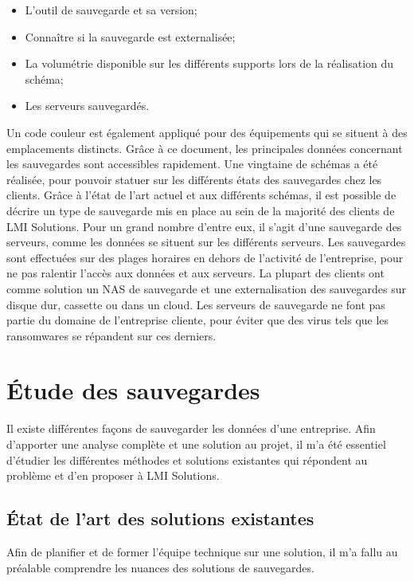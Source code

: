 \documentclass[pfe]{tnreport} %
\begin{document}
\begin{itemize}
 \item L'outil de sauvegarde et sa version;
 \item Connaître si la sauvegarde est externalisée;
 \item La volumétrie disponible sur les différents supports lors de la réalisation du schéma;
 \item Les serveurs sauvegardés.\newline
\end{itemize} 
Un code couleur est également appliqué pour des équipements qui se situent à des emplacements distincts.
Grâce à ce document, les principales données concernant les sauvegardes sont accessibles rapidement.
Une vingtaine de schémas a été réalisée, pour pouvoir statuer sur les différents états des sauvegardes chez les clients.
Grâce à l'état de l'art actuel et aux différents schémas, il est possible de décrire un type de sauvegarde mis en place au sein de la majorité des clients de LMI Solutions. \newline
Pour un grand nombre d'entre eux, il s'agit d'une sauvegarde des serveurs, comme les données se situent sur les différents serveurs. \newline
Les sauvegardes sont effectuées sur des plages horaires en dehors de l'activité de l'entreprise, pour ne pas ralentir l'accès aux données et aux serveurs. \newline
La plupart des clients ont comme solution un NAS de sauvegarde et une externalisation des sauvegardes sur disque dur, cassette ou dans un cloud. \newline
Les serveurs de sauvegarde ne font pas partie du domaine de l'entreprise cliente, pour éviter que des virus tels que les ransomwares se répandent sur ces derniers.
\section{Étude des sauvegardes}

Il existe différentes façons de sauvegarder les données d'une entreprise. \newline
Afin d'apporter une analyse complète et une solution au projet, il m'a été essentiel d'étudier les différentes méthodes et solutions existantes qui répondent au problème et d'en proposer à LMI Solutions. \newline

\subsection{État de l'art des solutions existantes}
Afin de planifier et de former l'équipe technique sur une solution, il m'a fallu au préalable comprendre les nuances des solutions de sauvegardes.
\end{document}
